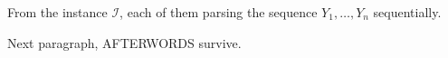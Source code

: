 \documentclass{cas-sc}
\newcommand{\inst}{\mathcal I}
\begin{document}
From the instance $\inst$, each of them parsing the sequence $Y_1,\ldots,Y_n$ sequentially.

Next paragraph, AFTERWORDS survive.
\end{document}
